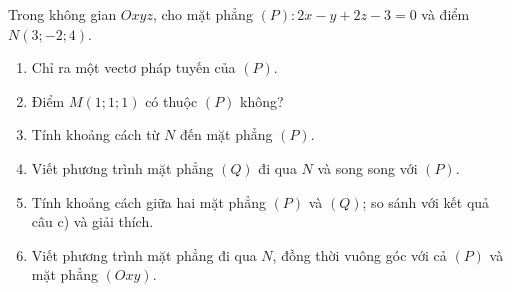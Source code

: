 \begin{bai}Trong không gian $Oxyz$, cho mặt phẳng $(P)\colon 2x-y+2z-3=0$ và điểm $N(3;-2;4)$.
\begin{enumerate}[label=\alph*)]
\item Chỉ ra một vectơ pháp tuyến của $(P)$.
\item Điểm $M(1;1;1)$ có thuộc $(P)$ không?
\item Tính khoảng cách từ $N$ đến mặt phẳng $(P)$.
\item Viết phương trình mặt phẳng $(Q)$ đi qua $N$ và song song với $(P)$.
\item Tính khoảng cách giữa hai mặt phẳng $(P)$ và $(Q)$; so sánh với kết quả câu c) và giải thích.
\item Viết phương trình mặt phẳng đi qua $N$, đồng thời vuông góc với cả $(P)$ và mặt phẳng $(Oxy)$.
\end{enumerate}
\end{bai}

